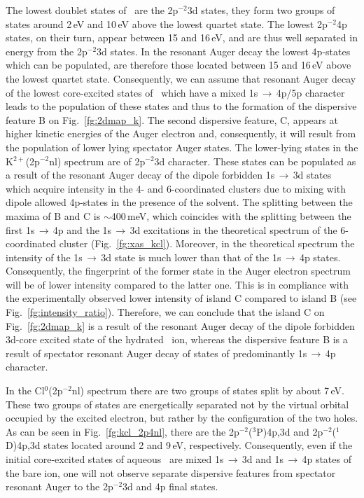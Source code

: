 The lowest doublet states of \ki~are the 2p$^{-2}$3d states, they form two groups of states around 2\,eV and 10\,eV above the lowest quartet state. The lowest 2p$^{-2}$4p states, on their turn, appear between 15 and 16\,eV, and are thus well separated in energy from the 2p$^{-2}$3d states. In the resonant Auger decay the lowest 4p-states which can be populated, are therefore those located between 15 and 16\,eV above the lowest quartet state. Consequently, we can assume that resonant Auger decay of the lowest core-excited states of \ki~which have a mixed 1s$\,\rightarrow\,$4p/5p character leads to the population of these states and thus to the formation of the dispersive feature B on Fig.\ \ref{fg:2dmap_k}. The second dispersive feature, C, appears at higher kinetic energies of the Auger electron and, consequently, it will result from the population of lower lying spectator Auger states. The lower-lying states in the K$^{2+}$(2p$^{-2}$nl) spectrum are of 2p$^{-2}$3d character. These states can be populated as a result of the resonant Auger decay of the dipole forbidden 1s$\,\rightarrow\,$3d states which acquire intensity in the 4- and 6-coordinated clusters due to mixing with dipole allowed 4p-states in the presence of the solvent. The splitting between the maxima of B and C is $\sim$400\,meV, which coincides with the splitting between the first 1s$\,\rightarrow\,$4p and the 1s$\,\rightarrow\,$3d excitations in the theoretical spectrum of the 6-coordinated cluster (Fig.\ \ref{fg:xas_kcl}). Moreover, in the theoretical spectrum the intensity of the 1s$\,\rightarrow\,$3d state is much lower than that of the 1s$\,\rightarrow\,$4p states. Consequently, the fingerprint of the former state in the Auger electron spectrum will be of lower intensity compared to the latter one. This is in compliance with the experimentally observed lower intensity of island C compared to island B (see Fig.\ \ref{fg:intensity_ratio}). Therefore, we can conclude that the island C on Fig.\ \ref{fg:2dmap_k} is a result of the resonant Auger decay of the dipole forbidden 3d-core excited state of the hydrated \ki~ion, whereas the dispersive feature B is a result of spectator resonant Auger decay of states of predominantly 1s$\,\rightarrow\,$4p character.


In the Cl$^{0}$(2p$^{-2}$nl) spectrum there are two groups of states split by about 7\,eV. These two groups of states are energetically separated not by the virtual orbital occupied by the excited electron, but rather by the configuration of the two holes. As can be seen in Fig.\ \ref{fg:kcl_2p4nl}, there are the 2p$^{-2}$($^3$P)4p,3d and 2p$^{-2}$($^1$D)4p,3d states located around 2 and 9\,eV, respectively. Consequently, even if the initial core-excited states of aqueous \cli~are mixed 1s$\,\rightarrow\,$3d and 1s$\,\rightarrow\,$4p states of the bare ion, one will not observe separate dispersive features from spectator resonant Auger to the 2p$^{-2}$3d and 4p final states.

